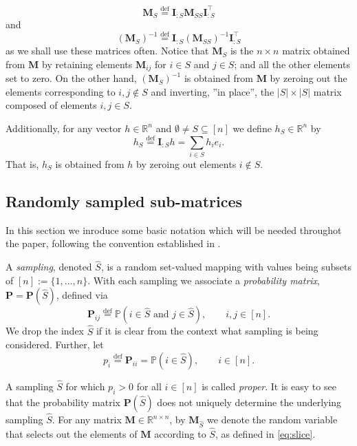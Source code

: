 \documentclass[11pt]{article}
\newcommand{\R}{\mathbb{R}}
\newcommand{\bI}{\mathbf{I}}
\newcommand{\bM}{\mathbf{M}}
\newcommand{\eqdef}{\overset{\text{def}}{=}}
\begin{document}
		\begin{equation}\label{eq:slice}
		\bM_S \eqdef \bI_{:S}\bM_{SS} \bI_{:S}^\top
		\end{equation}
		 and 
		 \begin{equation} \label{eq:inverse}
		 (\bM_{S})^{-1} \eqdef \bI_{:S}(\bM_{SS})^{-1} \bI_{:S}^\top
		 \end{equation} as we shall use these matrices often. Notice that $\mathbf{M}_{S}$ is the $n\times n$ matrix obtained from $\bM$ by retaining elements $\bM_{ij}$ for $i \in S$ and $j \in S$; and all the other elements  set to zero. On the other hand, $(\bM_{S})^{-1}$ is obtained from $\bM$ by zeroing out the elements corresponding to $i,j\notin S$ and inverting, ''in place'', the $|S|\times |S|$ matrix composed of elements $i,j\in S$. 
		
			Additionally, for any vector $h \in \mathbb{R}^n$ and $\emptyset \neq S\subseteq [n]$ we define $h_S\in \R^n$ by
			\begin{equation}
				h_S \eqdef \mathbf{I}_{:S}h=\sum_{i \in S}h_ie_i.
			\end{equation}
That is, $h_S$ is obtained from 	$h$ by zeroing out elements $i\notin S$.
		
	\subsection{Randomly sampled sub-matrices}
		In this section we inroduce some basic  notation which will be needed throughot the paper, following the convention established  in \cite{ESO}. 
	
	A {\em sampling}, denoted $\hat{S}$, is a random set-valued mapping with values being subsets of $[n]:= 
		\{1, \dots, n\}$.  With each sampling we associate a {\em probability matrix}, $\mathbf{P} = \mathbf{P}(\hat{S})$, defined via
		\begin{equation}
		\mathbf{P}_{ij}\eqdef\mathbb{P}(i \in \hat{S} \text{ and } j \in \hat{S}), \qquad i,j\in [n].
		\end{equation} 
		We drop the index $\hat{S}$ if  it is clear from the context what sampling is being considered. Further, let 
		\begin{equation}
		p_i\eqdef \mathbf{P}_{ii} = \mathbb{P}(i \in \hat{S}), \qquad i\in [n].
		\end{equation}

A sampling $\hat{S}$ for which $p_i>0$ for all $i\in [n]$ is called \emph{proper}. 	It is easy to see that the probability matrix $\mathbf{P}(\hat{S})$ does not uniquely determine the underlying sampling $\hat{S}$. For any matrix $\mathbf{M}\in \R^{n\times n}$, by $\mathbf{M}_{\hat{S}}$ we denote the random variable that selects out the elements of $\mathbf{M}$ according to  $\hat{S}$, as defined in \eqref{eq:slice}.
		
\end{document}
